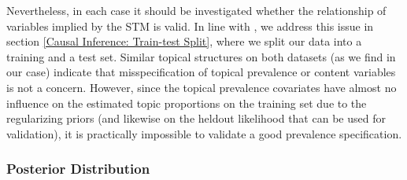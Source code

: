 Nevertheless, in each case it should be investigated whether the relationship of variables implied by the STM is valid. In line with \cite{egami2018make}, we address this issue in section \ref{Causal Inference: Train-test Split}, where we split our data into a training and a test set. Similar topical structures on both datasets (as we find in our case) indicate that misspecification of topical prevalence or content variables is not a concern. However, since the topical prevalence covariates have almost no influence on the estimated topic proportions on the training set due to the regularizing priors (and likewise on the heldout likelihood that can be used for validation), it is practically impossible to validate a good prevalence specification.

\subsubsection*{Posterior Distribution}

